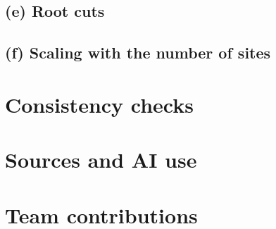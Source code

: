 \documentclass[11pt]{article}
\theoremstyle{definition}
\begin{document}
\subsection*{(e) Root cuts}

\subsection*{(f) Scaling with the number of sites}

\section*{Consistency checks}

\section*{Sources and AI use}

\section*{Team contributions}
\end{document}
